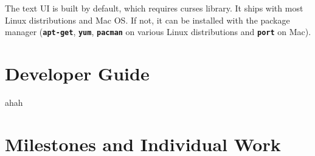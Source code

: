 \documentclass[12pt, a4paper]{article}
\newcommand{\cmdinline}[1]{{\bf \texttt{#1}}}
\begin{document}
The text UI is built by default, which requires curses library.
It ships with most Linux distributions and Mac OS. If not, it can be installed with the package manager (\cmdinline{apt-get}, \cmdinline{yum}, \cmdinline{pacman} on various Linux distributions and \cmdinline{port} on Mac).

\section{Developer Guide}
ahah

\section{Milestones and Individual Work}
\end{document}

